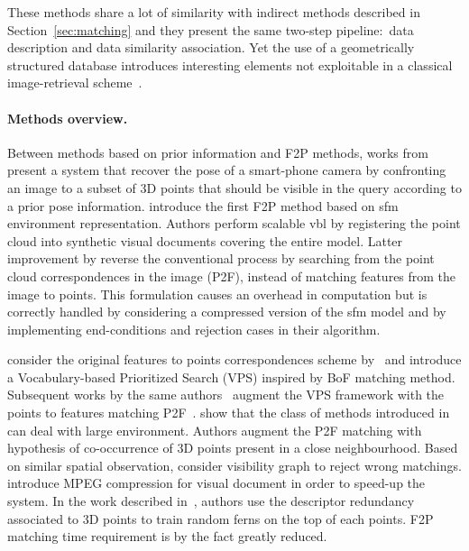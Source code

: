 These methods share a lot of similarity with indirect methods described in Section~\ref{sec:matching} and they present the same two-step pipeline:~data description and data similarity association. Yet the use of a geometrically structured database introduces interesting elements not exploitable in a classical image-retrieval scheme~\citep{Sattler2012a}.

\paragraph{Methods overview.}
Between methods based on prior information and F2P methods, works from \citet{Arth2009} present a system that recover the pose of a smart-phone camera by confronting an image to a subset of 3D points that should be visible in the query according to a prior pose information. \citet{Irschara2009} introduce the first F2P method based on \ac{sfm} environment representation. Authors perform scalable \ac{vbl} by registering the point cloud into synthetic visual documents covering the entire model. Latter improvement by \citet{Li2010} reverse the conventional process by searching from the point cloud correspondences in the image (P2F), instead of matching features from the image to points. This formulation causes an overhead in computation but is correctly handled by considering a compressed version of the \ac{sfm} model and by implementing end-conditions and rejection cases in their algorithm.

\citet{Sattler2011} consider the original features to points correspondences scheme by~\citep{Irschara2009} and introduce a Vocabulary-based Prioritized Search (VPS) inspired by BoF matching method. Subsequent works by the same authors~\citep{Sattler2012} augment the VPS framework with the points to features matching P2F~\citep{Li2010}. \citet{Li2012} show that the class of methods introduced in~\citep{Irschara2009,Li2010} can deal with large environment. Authors augment the P2F matching with hypothesis of co-occurrence of 3D points present in a close neighbourhood. Based on similar spatial observation, \citet{Sattler2015} consider visibility graph to reject wrong matchings. \citet{Heisterklaus2014} introduce MPEG compression for visual document in order to speed-up the system. In the work described in~\citep{Donoser2014}, authors use the descriptor redundancy associated to 3D points to train random ferns on the top of each points. F2P matching time requirement is by the fact greatly reduced. 

